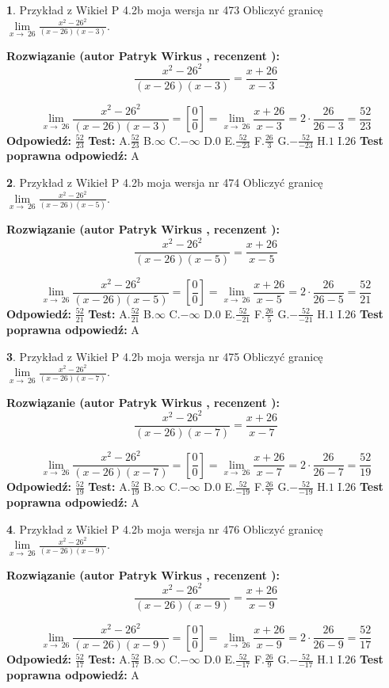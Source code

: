 \documentclass[12pt, a4paper]{article}
\theoremstyle{definition} %
\newtheorem{zad}{}
\newcommand{\zadStart}[1]{\begin{zad}#1\newline}
\newcommand{\zadStop}{\end{zad}}
\newcommand{\rozwStart}[2]{\noindent \textbf{Rozwiązanie (autor #1 , recenzent #2): }\newline}
\newcommand{\rozwStop}{\newline}
\newcommand{\odpStart}{\noindent \textbf{Odpowiedź:}\newline}
\newcommand{\odpStop}{\newline}
\newcommand{\testStart}{\noindent \textbf{Test:}\newline}
\newcommand{\testStop}{\newline}
\newcommand{\kluczStart}{\noindent \textbf{Test poprawna odpowiedź:}\newline}
\newcommand{\kluczStop}{\newline}
\begin{document}
\zadStart{Przykład z Wikieł P 4.2b moja wersja nr 473}
Obliczyć granicę $\lim\limits_{x\to\ 26}\frac{x^{2}-26^{2}}{(x-26)(x-3)}$.
\zadStop
\rozwStart{Patryk Wirkus}{}
$$\frac{x^{2}-26^{2}}{(x-26)(x-3)}=\frac{x+26}{x-3}$$

$$\lim\limits_{x\to\ 26}\frac{x^{2}-26^{2}}{(x-26)(x-3)}=[\frac{0}{0}]=\lim\limits_{x\to\ 26}\frac{x+26}{x-3}=2 \cdot \frac{26}{26-3} = \frac{52}{23}$$
\rozwStop
\odpStart
$\frac{52}{23}$
\odpStop
\testStart
A.$\frac{52}{23}$
B.$\infty$
C.$-\infty$
D.$0$
E.$\frac{52}{-23}$
F.$\frac{26}{3}$
G.$-\frac{52}{-23}$
H.$1$
I.$26$
\testStop
\kluczStart
A
\kluczStop



\zadStart{Przykład z Wikieł P 4.2b moja wersja nr 474}
Obliczyć granicę $\lim\limits_{x\to\ 26}\frac{x^{2}-26^{2}}{(x-26)(x-5)}$.
\zadStop
\rozwStart{Patryk Wirkus}{}
$$\frac{x^{2}-26^{2}}{(x-26)(x-5)}=\frac{x+26}{x-5}$$

$$\lim\limits_{x\to\ 26}\frac{x^{2}-26^{2}}{(x-26)(x-5)}=[\frac{0}{0}]=\lim\limits_{x\to\ 26}\frac{x+26}{x-5}=2 \cdot \frac{26}{26-5} = \frac{52}{21}$$
\rozwStop
\odpStart
$\frac{52}{21}$
\odpStop
\testStart
A.$\frac{52}{21}$
B.$\infty$
C.$-\infty$
D.$0$
E.$\frac{52}{-21}$
F.$\frac{26}{5}$
G.$-\frac{52}{-21}$
H.$1$
I.$26$
\testStop
\kluczStart
A
\kluczStop



\zadStart{Przykład z Wikieł P 4.2b moja wersja nr 475}
Obliczyć granicę $\lim\limits_{x\to\ 26}\frac{x^{2}-26^{2}}{(x-26)(x-7)}$.
\zadStop
\rozwStart{Patryk Wirkus}{}
$$\frac{x^{2}-26^{2}}{(x-26)(x-7)}=\frac{x+26}{x-7}$$

$$\lim\limits_{x\to\ 26}\frac{x^{2}-26^{2}}{(x-26)(x-7)}=[\frac{0}{0}]=\lim\limits_{x\to\ 26}\frac{x+26}{x-7}=2 \cdot \frac{26}{26-7} = \frac{52}{19}$$
\rozwStop
\odpStart
$\frac{52}{19}$
\odpStop
\testStart
A.$\frac{52}{19}$
B.$\infty$
C.$-\infty$
D.$0$
E.$\frac{52}{-19}$
F.$\frac{26}{7}$
G.$-\frac{52}{-19}$
H.$1$
I.$26$
\testStop
\kluczStart
A
\kluczStop



\zadStart{Przykład z Wikieł P 4.2b moja wersja nr 476}
Obliczyć granicę $\lim\limits_{x\to\ 26}\frac{x^{2}-26^{2}}{(x-26)(x-9)}$.
\zadStop
\rozwStart{Patryk Wirkus}{}
$$\frac{x^{2}-26^{2}}{(x-26)(x-9)}=\frac{x+26}{x-9}$$

$$\lim\limits_{x\to\ 26}\frac{x^{2}-26^{2}}{(x-26)(x-9)}=[\frac{0}{0}]=\lim\limits_{x\to\ 26}\frac{x+26}{x-9}=2 \cdot \frac{26}{26-9} = \frac{52}{17}$$
\rozwStop
\odpStart
$\frac{52}{17}$
\odpStop
\testStart
A.$\frac{52}{17}$
B.$\infty$
C.$-\infty$
D.$0$
E.$\frac{52}{-17}$
F.$\frac{26}{9}$
G.$-\frac{52}{-17}$
H.$1$
I.$26$
\testStop
\kluczStart
A
\kluczStop
\end{document}
